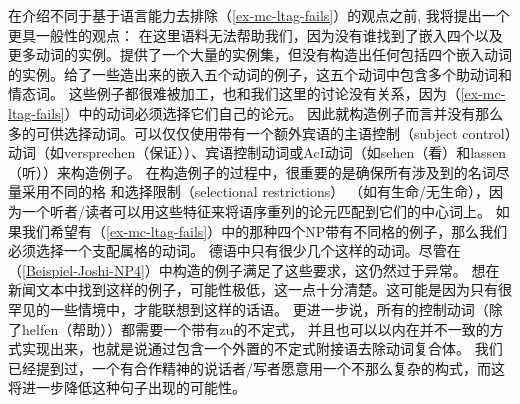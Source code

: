 在介绍不同于基于语言能力去排除（\ref{ex-mc-ltag-fails}）的观点之前, 我将提出一个更具一般性的观点：
在这里语料无法帮助我们，因为没有谁找到了嵌入四个以及更多动词的实例。\citet{Bech55a}提供了一个大量的实例集，但没有构造出任何包括四个嵌入动词的实例。\citet[--95]{Meurers99c}给了一些造出来的嵌入五个动词的例子，这五个动词中包含多个助动词和情态词。
这些例子都很难被加工，也和我们这里的讨论没有关系，因为（\ref{ex-mc-ltag-fails}）中的动词必须选择它们自己的论元。
因此就构造例子而言并没有那么多的可供选择动词。可以仅仅使用带有一个额外宾语的主语控制（subject control）动词（如versprechen（保证））、宾语控制动词或AcI动词（如sehen（看）和lassen（听））来构造例子。
在构造例子的过程中，很重要的是确保所有涉及到的名词尽量采用不同的格
和选择限制（selectional restrictions）
（如有生命/无生命），因为一个听者/读者可以用这些特征来将语序重列的论元匹配到它们的中心词上。
如果我们希望有（\ref{ex-mc-ltag-fails}）中的那种四个NP带有不同格的例子，那么我们必须选择一个支配属格的动词。
德语中只有很少几个这样的动词。尽管\citet{JBR2000a}在（\ref{Beispiel-Joshi-NP4}）中构造的例子满足了这些要求，这仍然过于异常。
想在新闻文本中找到这样的例子，可能性极低，这一点十分清楚。这可能是因为只有很罕见的一些情境中，才能联想到这样的话语。
更进一步说，所有的控制动词（除了helfen（帮助））都需要一个带有zu的不定式，
并且也可以以内在并不一致的方式实现出来，也就是说通过包含一个外置的不定式附接语去除动词复合体。
我们已经提到过，一个有合作精神的说话者/写者愿意用一个不那么复杂的构式，而这将进一步降低这种句子出现的可能性。

